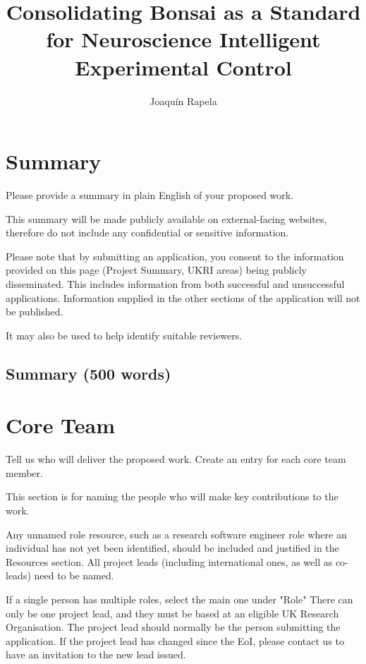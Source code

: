 \documentclass[12pt]{article}
\title{Consolidating Bonsai as a Standard for Neuroscience Intelligent
Experimental Control}
\author{Joaqu\'{i}n Rapela}
\newenvironment{instruction}{%
    \begin{tcolorbox}[colback=red!5,colframe=red,title=Instruction]%
}{%
    \end{tcolorbox}%
}
\begin{document}
\maketitle

\section*{Summary}

\begin{instruction}

Please provide a summary in plain English of your proposed work.

This summary will be made publicly available on external-facing websites, therefore do not include any confidential or sensitive information.

Please note that by submitting an application, you consent to the information provided on this page (Project Summary, UKRI areas) being publicly disseminated. This includes information from both successful and unsuccessful applications. Information supplied in the other sections of the application will not be published.

It may also be used to help identify suitable reviewers.

\end{instruction}

\subsection*{Summary (500 words)}

\pagebreak

\section*{Core Team}

\begin{instruction}

Tell us who will deliver the proposed work. Create an entry for each core team member.

This section is for naming the people who will make key contributions to the work.

Any unnamed role resource, such as a research software engineer role where an individual has not yet been identified, should be included and justified in the Resources section. All project leads (including international ones, as well as co-leads) need to be named.

If a single person has multiple roles, select the main one under "Role"
There can only be one project lead, and they must be based at an eligible UK Research Organisation. The project lead should normally be the person submitting the application.
If the project lead has changed since the EoI, please contact us to have an invitation to the new lead issued.

\end{instruction}
\end{document}
